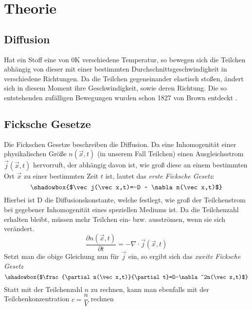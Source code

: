 \documentclass[12pt,a4paper,titlepage,headinclude,bibtotoc]{scrartcl}
\begin{document}
\section{Theorie}
\label{sec:theorie}
\subsection{Diffusion}
Hat ein Stoff eine von 0K verschiedene Temperatur, so bewegen sich die Teilchen abhängig von dieser mit einer bestimmten Durchschnittsgeschwindigkeit in verschiedene Richtungen.
Da die Teilchen gegeneinander elastisch stoßen, ändert sich in diesem Moment ihre Geschwindigkeit, sowie deren Richtung.
Die so entstehenden zufälligen Bewegungen wurden schon 1827 von Brown entdeckt \cite[S. 8]{demtroeder}.

\subsection{Ficksche Gesetze}
Die Fickschen Gesetze beschreiben die Diffusion.
Da eine Inhomogenität einer physikalischen Größe $n(\vec x,t)$ (in unserem Fall Teilchen) einen Ausgleichsstrom $\vec j(\vec x,t)$ hervorruft, der abhängig davon ist, wie groß diese an einem bestimmten Ort $\vec x$ zu einer bestimmten Zeit $t$ ist, lautet das \emph{erste Ficksche Gesetz}:
$$\shadowbox{$\vec j(\vec x,t)=-D ~ \nabla n(\vec x,t)$}$$
Hierbei ist D die Diffusionskonstante, welche festlegt, wie groß der Teilchenstrom bei gegebener Inhomogenität eines speziellen Mediums ist.
Da die Teilchenzahl erhalten bleibt, müssen mehr Teilchen ein- bzw. ausströmen, wenn sie sich verändert.
$$\frac{\partial n(\vec x,t)}{\partial t}=-\nabla\cdot \vec j(\vec x,t)$$
Setzt man die obige Gleichung nun für $\vec j$ ein, so ergibt sich das \emph{zweite Ficksche Gesetz}
$$\shadowbox{$\frac{\partial n(\vec x,t)}{\partial t}=D~\nabla^2n(\vec x,t)$}$$
Statt mit der Teilchenzahl $n$ zu rechnen, kann man ebenfalls mit der Teilchenkonzentration $c=\dfrac{n}{V}$ rechnen
\end{document}
